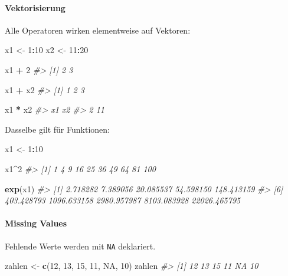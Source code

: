 \documentclass[
]{article}
\newenvironment{Shaded}{\begin{snugshade}}{\end{snugshade}}
\newcommand{\CommentTok}[1]{\textcolor[rgb]{0.56,0.35,0.01}{\textit{#1}}}
\newcommand{\ConstantTok}[1]{\textcolor[rgb]{0.56,0.35,0.01}{#1}}
\newcommand{\DecValTok}[1]{\textcolor[rgb]{0.00,0.00,0.81}{#1}}
\newcommand{\FunctionTok}[1]{\textcolor[rgb]{0.13,0.29,0.53}{\textbf{#1}}}
\newcommand{\NormalTok}[1]{#1}
\newcommand{\OtherTok}[1]{\textcolor[rgb]{0.56,0.35,0.01}{#1}}
\newcommand{\SpecialCharTok}[1]{\textcolor[rgb]{0.81,0.36,0.00}{\textbf{#1}}}
\begin{document}
\hypertarget{vektorisierung}{%
\paragraph{Vektorisierung}\label{vektorisierung}}

Alle Operatoren wirken elementweise auf Vektoren:

\begin{Shaded}
\begin{Highlighting}[]
\NormalTok{x1 }\OtherTok{\textless{}{-}} \DecValTok{1}\SpecialCharTok{:}\DecValTok{10}
\NormalTok{x2 }\OtherTok{\textless{}{-}} \DecValTok{11}\SpecialCharTok{:}\DecValTok{20}

\NormalTok{x1 }\SpecialCharTok{+} \DecValTok{2}
\CommentTok{\#\textgreater{} [1] 2 3}

\NormalTok{x1 }\SpecialCharTok{+}\NormalTok{ x2}
\CommentTok{\#\textgreater{} [1] 1 2 3}

\NormalTok{x1 }\SpecialCharTok{*}\NormalTok{ x2}
\CommentTok{\#\textgreater{} x1 x2 }
\CommentTok{\#\textgreater{}  2 11}
\end{Highlighting}
\end{Shaded}

Dasselbe gilt für Funktionen:

\begin{Shaded}
\begin{Highlighting}[]
\NormalTok{x1 }\OtherTok{\textless{}{-}} \DecValTok{1}\SpecialCharTok{:}\DecValTok{10}

\NormalTok{x1}\SpecialCharTok{\^{}}\DecValTok{2}
\CommentTok{\#\textgreater{}  [1]   1   4   9  16  25  36  49  64  81 100}

\FunctionTok{exp}\NormalTok{(x1)}
\CommentTok{\#\textgreater{}  [1]     2.718282     7.389056    20.085537    54.598150   148.413159}
\CommentTok{\#\textgreater{}  [6]   403.428793  1096.633158  2980.957987  8103.083928 22026.465795}
\end{Highlighting}
\end{Shaded}

\hypertarget{missing-values}{%
\paragraph{Missing Values}\label{missing-values}}

Fehlende Werte werden mit \texttt{NA} deklariert.

\begin{Shaded}
\begin{Highlighting}[]
\NormalTok{zahlen }\OtherTok{\textless{}{-}} \FunctionTok{c}\NormalTok{(}\DecValTok{12}\NormalTok{, }\DecValTok{13}\NormalTok{, }\DecValTok{15}\NormalTok{, }\DecValTok{11}\NormalTok{, }\ConstantTok{NA}\NormalTok{, }\DecValTok{10}\NormalTok{)}
\NormalTok{zahlen}
\CommentTok{\#\textgreater{} [1] 12 13 15 11 NA 10}
\end{Highlighting}
\end{Shaded}
\end{document}
